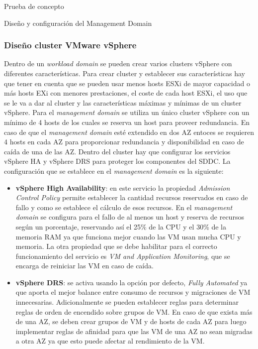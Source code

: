 \begin{section}{Prueba de concepto}
\begin{subsection}{Diseño y configuración del Management Domain}
    \subsubsection{Diseño cluster VMware vSphere}
    Dentro de un \textit{workload domain} se pueden crear varios clusters vSphere con diferentes características. Para crear cluster y establecer sus características hay que tener en cuenta que se pueden usar menos hosts ESXi de mayor capacidad o más hosts EXi con menores prestaciones, el coste de cada host ESXi, el uso que se le va a dar al cluster y las características máximas y mínimas de un cluster vSphere. Para el \textit{management domain} se utiliza un único cluster vSphere con un mínimo de 4 hosts de los cuales se reserva un host para proveer redundancia. En caso de que el \textit{management domain} esté extendido en dos AZ entoces se requieren 4 hosts en cada AZ para proporcionar redundancia y disponibilidad en caso de caída de una de las AZ.
    Dentro del cluster hay que configurar los servicios vSphere HA y vSphere DRS para proteger los componentes del SDDC. La configuración que se establece en el \textit{management domain} es la siguiente:
    \begin{itemize}
        \item \textbf{vSphere High Availability}: en este servicio la propiedad \textit{Admission Control Policy} permite establecer la cantidad recursos reservados en caso de fallo y como se establece el cálculo de esos recursos. En el \textit{management domain} se configura para el fallo de al menos un host y reserva de recursos según un porcentaje, reservando así el 25\% de la CPU y el 30\% de la memoria RAM ya que funciona mejor cuando las VM usan mucha CPU y memoria. La otra propiedad que se debe habilitar para el correcto funcionamiento del servicio es \textit{VM and Application Monitoring}, que se encarga de reiniciar las VM en caso de caída.
        \item \textbf{vSphere DRS}: se activa usando la opción por defecto, \textit{Fully Automated} ya que aporta el mejor balance entre consumo de recursos y migraciones de VM innecesarias. Adicionalmente se pueden establecer reglas para determinar reglas de orden de encendido sobre grupos de VM. En caso de que exista más de una AZ, se deben crear grupos de VM y de hosts de cada AZ para luego implementar reglas de afinidad para que las VM de una AZ no sean migradas a otra AZ ya que esto puede afectar al rendimiento de la VM. 
    \end{itemize}

\end{subsection}
\end{section}
